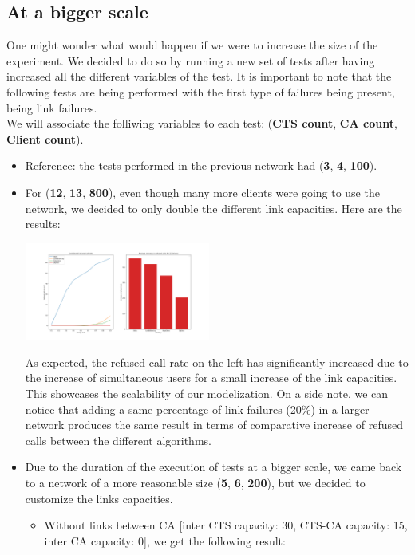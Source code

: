 \documentclass[lettersize,journal]{IEEEtran} %
\begin{document}
\subsection{At a bigger scale}
One might wonder what would happen if we were to increase the size of the experiment. We decided to do so by running a new set of tests after
having increased all the different variables of the test.
It is important to note that the following tests are being performed with the first type of failures being present, being link failures.\\
We will associate the folliwing variables to each test: (\textbf{CTS count}, \textbf{CA count}, \textbf{Client count}).
\begin{itemize}
        \item Reference: the tests performed in the previous network had (\textbf{3}, \textbf{4}, \textbf{100}).
        \item For (\textbf{12}, \textbf{13}, \textbf{800}), even though many more clients were going to use the network,
        we decided to only double the different link capacities. Here are the results:
        \begin{center}
                \includegraphics[width=0.48\textwidth]{bigger_network.png}       
        \end{center}
        As expected, the refused call rate on the left has significantly increased due to the increase of simultaneous users for a small
        increase of the link capacities. This showcases the scalability of our modelization. On a side note, we can notice that adding
        a same percentage of link failures (20\%) in a larger network produces the same result in terms of comparative increase of refused calls
        between the different algorithms. 
        \item Due to the duration of the execution of tests at a bigger scale, we came back to a network of a more reasonable size
        (\textbf{5}, \textbf{6}, \textbf{200}), but we decided to customize the links capacities.
        \begin{itemize}
                \item Without links between CA [inter CTS capacity: 30, CTS-CA capacity: 15, inter CA capacity: 0], we get the following result:

\end{itemize}
\end{itemize}
\end{document}
